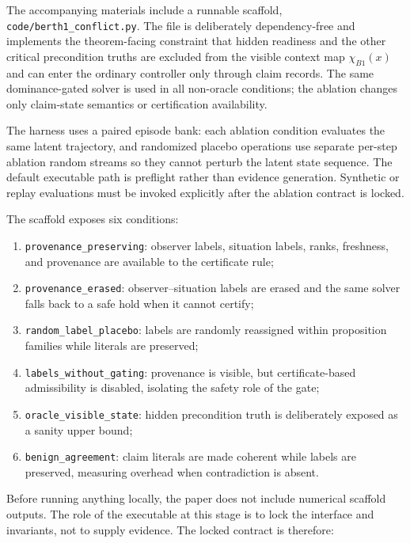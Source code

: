 \documentclass[11pt]{article}
\newcommand{\1}{\mathbf{1}}
\theoremstyle{definition}
\theoremstyle{plain}
\theoremstyle{remark}
\begin{document}
The accompanying materials include a runnable scaffold, \texttt{code/berth1\_conflict.py}. The file is deliberately dependency-free and implements the theorem-facing constraint that hidden readiness and the other critical precondition truths are excluded from the visible context map $\chi_{B1}(x)$ and can enter the ordinary controller only through claim records. The same dominance-gated solver is used in all non-oracle conditions; the ablation changes only claim-state semantics or certification availability.

The harness uses a paired episode bank: each ablation condition evaluates the same latent trajectory, and randomized placebo operations use separate per-step ablation random streams so they cannot perturb the latent state sequence. The default executable path is preflight rather than evidence generation. Synthetic or replay evaluations must be invoked explicitly after the ablation contract is locked.

The scaffold exposes six conditions:
\begin{enumerate}[leftmargin=1.7em,label=\arabic*.]
\item \texttt{provenance\_preserving}: observer labels, situation labels, ranks, freshness, and provenance are available to the certificate rule;
\item \texttt{provenance\_erased}: observer--situation labels are erased and the same solver falls back to a safe hold when it cannot certify;
\item \texttt{random\_label\_placebo}: labels are randomly reassigned within proposition families while literals are preserved;
\item \texttt{labels\_without\_gating}: provenance is visible, but certificate-based admissibility is disabled, isolating the safety role of the gate;
\item \texttt{oracle\_visible\_state}: hidden precondition truth is deliberately exposed as a sanity upper bound;
\item \texttt{benign\_agreement}: claim literals are made coherent while labels are preserved, measuring overhead when contradiction is absent.
\end{enumerate}

Before running anything locally, the paper does not include numerical scaffold outputs. The role of the executable at this stage is to lock the interface and invariants, not to supply evidence. The locked contract is therefore:
\end{document}
